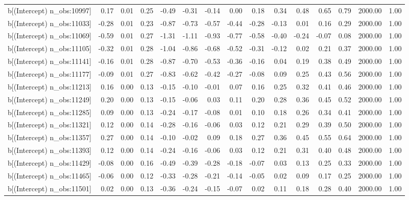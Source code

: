 \begin{table}[ht]
\begin{tabular}{rrrrrrrrrrrrrrr}
  b[(Intercept) n\_obs:10997] & 0.17 & 0.01 & 0.25 & -0.49 & -0.31 & -0.14 & 0.00 & 0.18 & 0.34 & 0.48 & 0.65 & 0.79 & 2000.00 & 1.00 \\ 
  b[(Intercept) n\_obs:11033] & -0.28 & 0.01 & 0.23 & -0.87 & -0.73 & -0.57 & -0.44 & -0.28 & -0.13 & 0.01 & 0.16 & 0.29 & 2000.00 & 1.00 \\ 
  b[(Intercept) n\_obs:11069] & -0.59 & 0.01 & 0.27 & -1.31 & -1.11 & -0.93 & -0.77 & -0.58 & -0.40 & -0.24 & -0.07 & 0.08 & 2000.00 & 1.00 \\ 
  b[(Intercept) n\_obs:11105] & -0.32 & 0.01 & 0.28 & -1.04 & -0.86 & -0.68 & -0.52 & -0.31 & -0.12 & 0.02 & 0.21 & 0.37 & 2000.00 & 1.00 \\ 
  b[(Intercept) n\_obs:11141] & -0.16 & 0.01 & 0.28 & -0.87 & -0.70 & -0.53 & -0.36 & -0.16 & 0.04 & 0.19 & 0.38 & 0.49 & 2000.00 & 1.00 \\ 
  b[(Intercept) n\_obs:11177] & -0.09 & 0.01 & 0.27 & -0.83 & -0.62 & -0.42 & -0.27 & -0.08 & 0.09 & 0.25 & 0.43 & 0.56 & 2000.00 & 1.00 \\ 
  b[(Intercept) n\_obs:11213] & 0.16 & 0.00 & 0.13 & -0.15 & -0.10 & -0.01 & 0.07 & 0.16 & 0.25 & 0.32 & 0.41 & 0.46 & 2000.00 & 1.00 \\ 
  b[(Intercept) n\_obs:11249] & 0.20 & 0.00 & 0.13 & -0.15 & -0.06 & 0.03 & 0.11 & 0.20 & 0.28 & 0.36 & 0.45 & 0.52 & 2000.00 & 1.00 \\ 
  b[(Intercept) n\_obs:11285] & 0.09 & 0.00 & 0.13 & -0.24 & -0.17 & -0.08 & 0.01 & 0.10 & 0.18 & 0.26 & 0.34 & 0.41 & 2000.00 & 1.00 \\ 
  b[(Intercept) n\_obs:11321] & 0.12 & 0.00 & 0.14 & -0.28 & -0.16 & -0.06 & 0.03 & 0.12 & 0.21 & 0.29 & 0.39 & 0.50 & 2000.00 & 1.00 \\ 
  b[(Intercept) n\_obs:11357] & 0.27 & 0.00 & 0.14 & -0.10 & -0.02 & 0.09 & 0.18 & 0.27 & 0.36 & 0.45 & 0.55 & 0.64 & 2000.00 & 1.00 \\ 
  b[(Intercept) n\_obs:11393] & 0.12 & 0.00 & 0.14 & -0.24 & -0.16 & -0.06 & 0.03 & 0.12 & 0.21 & 0.31 & 0.40 & 0.48 & 2000.00 & 1.00 \\ 
  b[(Intercept) n\_obs:11429] & -0.08 & 0.00 & 0.16 & -0.49 & -0.39 & -0.28 & -0.18 & -0.07 & 0.03 & 0.13 & 0.25 & 0.33 & 2000.00 & 1.00 \\ 
  b[(Intercept) n\_obs:11465] & -0.06 & 0.00 & 0.12 & -0.33 & -0.28 & -0.21 & -0.14 & -0.05 & 0.02 & 0.09 & 0.17 & 0.25 & 2000.00 & 1.00 \\ 
  b[(Intercept) n\_obs:11501] & 0.02 & 0.00 & 0.13 & -0.36 & -0.24 & -0.15 & -0.07 & 0.02 & 0.11 & 0.18 & 0.28 & 0.40 & 2000.00 & 1.00 \\ 

\end{tabular}
\end{table}

